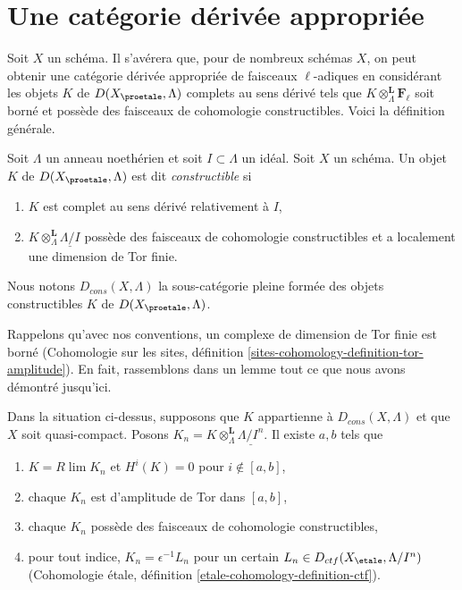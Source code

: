 \section{Une catégorie dérivée appropriée}
\label{section-suitable-derived}

\noindent
Soit $X$ un schéma. Il s'avérera que, pour de nombreux schémas $X$, on peut obtenir une
catégorie dérivée appropriée de faisceaux $\ell$-adiques en considérant les
objets $K$ de $D(X_\proetale, \Lambda)$ complets au sens dérivé tels
que $K \otimes_\Lambda^\mathbf{L} \mathbf{F}_\ell$ soit borné et possède des
faisceaux de cohomologie constructibles. Voici la définition générale.

\begin{definition}
\label{definition-Dbc}
Soit $\Lambda$ un anneau noethérien et soit $I \subset \Lambda$ un idéal.
Soit $X$ un schéma. Un objet $K$ de $D(X_\proetale, \Lambda)$ est dit
{\it constructible} si
\begin{enumerate}
\item $K$ est complet au sens dérivé relativement à $I$,
\item $K \otimes_\Lambda^\mathbf{L} \underline{\Lambda/I}$
possède des faisceaux de cohomologie constructibles et a localement une dimension de Tor finie.
\end{enumerate}
Nous notons $D_{cons}(X, \Lambda)$ la sous-catégorie pleine formée des objets constructibles
$K$ de $D(X_\proetale, \Lambda)$.
\end{definition}

\noindent
Rappelons qu'avec nos conventions, un complexe de dimension de Tor finie
est borné (Cohomologie sur les sites, définition
\ref{sites-cohomology-definition-tor-amplitude}).
En fait, rassemblons dans un lemme tout ce que nous avons démontré jusqu'ici.

\begin{lemma}
\label{lemma-describe-constructible-complexes}
Dans la situation ci-dessus, supposons que $K$ appartienne à $D_{cons}(X, \Lambda)$
et que $X$ soit quasi-compact. Posons
$K_n = K \otimes_\Lambda^\mathbf{L} \underline{\Lambda/I^n}$.
Il existe $a, b$ tels que
\begin{enumerate}
\item $K = R\lim K_n$ et $H^i(K) = 0$ pour $i \not \in [a, b]$,
\item chaque $K_n$ est d'amplitude de Tor dans $[a, b]$,
\item chaque $K_n$ possède des faisceaux de cohomologie constructibles,
\item pour tout indice, $K_n = \epsilon^{-1}L_n$ pour un certain
$L_n \in D_{ctf}(X_\etale, \Lambda/I^n)$
(Cohomologie \'etale, définition \ref{etale-cohomology-definition-ctf}).
\end{enumerate}
\end{lemma}

